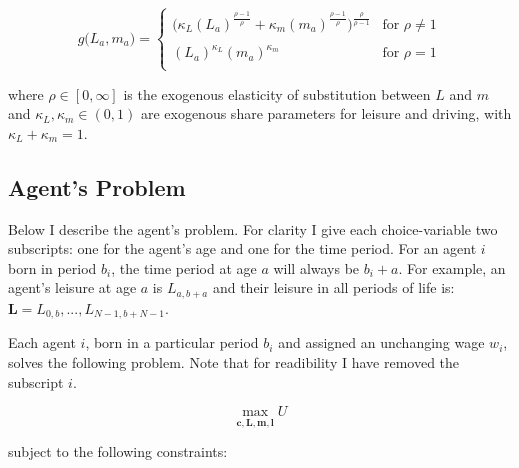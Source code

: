 \documentclass[letter, 12pt, epsf,leqno]{article}
\begin{document}
\begin{equation}
g\Big(L_{a}, m_{a}\Big)=
   \begin{cases} 
       \Bigg(\kappa_L (L_{a})^\frac{\rho-1}{\rho} + \kappa_m (m_{a})^\frac{\rho-1}{\rho}\Bigg)^\frac{\rho}{\rho-1}& \text{for } \rho \ne 1 \\
      \\
     (L_{a})^{\kappa_L} (m_{a})^{\kappa_m} & \text{for } \rho = 1\\ 
   \end{cases} 
\label{eq:g}
\end{equation}

where $\rho \in [0, \infty]$ is the exogenous elasticity of substitution between $L$ and $m$ and $\kappa_L, \kappa_m  \in (0, 1)$ are exogenous share parameters for leisure and driving, with $\kappa_L+\kappa_m=1$.  


\subsection{Agent's Problem}

Below I describe the agent's problem.  For clarity I give each choice-variable two subscripts: one for the agent's age and one for the time period.  For an agent $i$ born in period $b_i$, the time period at age $a$ will always be $b_i+a$.  For example, an agent's leisure at age $a$ is $L_{a, b+a}$ and their leisure in all periods of life is: $\boldsymbol{L}=L_{0, b},...,L_{N-1, b+N-1}$.

Each agent $i$, born in a particular period $b_i$ and assigned an unchanging wage $w_i$, solves the following problem.  Note that for readibility I have removed the subscript $i$.  

\begin{equation}\max_{\boldsymbol{c}, \boldsymbol{L}, \boldsymbol{m}, \boldsymbol{l}} U\end{equation}

subject to the following constraints:
\end{document}
